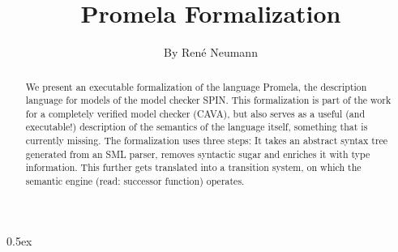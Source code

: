 \documentclass[11pt,a4paper]{article}
\begin{document}
\title{Promela Formalization}
\author{By Ren\'{e} Neumann}
\maketitle

\begin{abstract}
    We present an executable formalization of the language Promela, the description language for models of the model checker SPIN. This formalization is part of the work for a completely verified
    model checker (CAVA), but also serves as a useful (and executable!) description of the semantics of the language itself, something that is currently missing.
    The formalization uses three steps: It takes an abstract syntax tree generated from an SML parser, removes syntactic sugar and enriches it with type information. This further gets translated into a transition system, on which the semantic engine (read: successor function) operates.
\end{abstract}

\clearpage

\tableofcontents

\clearpage



\parindent 0pt\parskip 0.5ex





\end{document}
